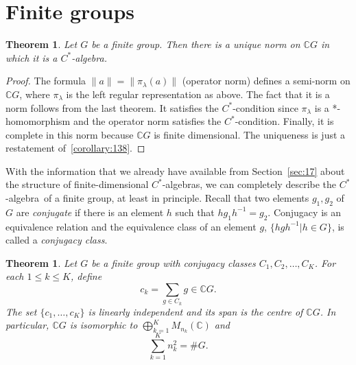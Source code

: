 \documentclass{book}
\newtheorem{theorem}[definition]{Theorem}
\def\cstar{\(C^*\)-algebra}
\def\cstars{\(C^*\)-algebras}
\begin{document}
\section{Finite groups}
\begin{theorem}
  Let \(G\) be a finite group. Then there is a unique norm on
  \(\mathbb{C}G\) in which it is a \cstar.
\end{theorem}
\begin{proof}
  The formula \(\|a\| = \|\pi_\lambda(a)\|\) (operator norm) defines a semi-norm on
  \(\mathbb{C}G\), where \(\pi_\lambda\) is the left regular representation as above. The fact that it
  is a norm follows from the last theorem. It satisfies the \(C^*\)-condition since
  \(\pi_\lambda\) is a *-homomorphism and the operator norm satisfies the \(C^*\)-condition.
  Finally, it is complete in this norm because \(\mathbb{C}G\) is finite dimensional. The
  uniqueness is just a restatement of~\ref{corollary:138}.
\end{proof}
With the information that we already have available from Section~\ref{sec:17}
about the structure of finite-dimensional \cstars, we can completely 
describe the \cstar\ of a finite group, at least in principle. Recall that
two elements \(g_1,g_2\) of \(G\) are \textit{conjugate} if there is an element \(h\) such that
\(hg_1h^{-1} = g_2\). Conjugacy is an equivalence relation and the equivalence class
of an element \(g\), \(\{hgh^{-1} | h \in G\}\), is called a \textit{conjugacy class}.
\begin{theorem}\label{theorem:232}
  Let \(G\) be a finite group with conjugacy classes
  \(C_1,C_2,\ldots,C_K\). For each \(1 \leq k \leq K\), define
  \[
  c_k =\sum_{g\in C_k} g \in \mathbb{C}G.
  \]
  The set \(\{c_1,\ldots,c_K\}\) is linearly independent and its span is the centre of \(\mathbb{C}G\).
  In particular, \(\mathbb{C}G\) is isomorphic to \(\bigoplus^K_{k=1} M_{n_k}(\mathbb{C})\) and
  \[
  \sum^K_{k=1} n_k^2 = \#G.
  \]
\end{theorem}
\end{document}
